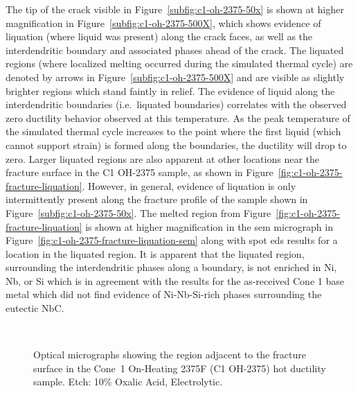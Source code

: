 The tip of the crack visible in Figure~\ref{subfig:c1-oh-2375-50x} is shown at higher magnification in Figure~\ref{subfig:c1-oh-2375-500X}, which shows evidence of liquation (where liquid was present) along the crack faces, as well as the interdendritic boundary and associated phases ahead of the crack. The liquated regions (where localized melting occurred during the simulated thermal cycle) are denoted by arrows in Figure~\ref{subfig:c1-oh-2375-500X} and are visible as slightly brighter regions which stand faintly in relief. The evidence of liquid along the interdendritic boundaries (i.e.~liquated boundaries) correlates with the observed zero ductility behavior observed at this temperature. As the peak temperature of the simulated thermal cycle increases to the point where the first liquid (which cannot support strain) is formed along the boundaries, the ductility will drop to zero. Larger liquated regions are also apparent at other locations near the fracture surface in the C1 OH-2375 sample, as shown in Figure~\ref{fig:c1-oh-2375-fracture-liquation}. However, in general, evidence of liquation is only intermittently present along the fracture profile of the sample shown in Figure~\ref{subfig:c1-oh-2375-50x}. The melted region from Figure~\ref{fig:c1-oh-2375-fracture-liquation} is shown at higher magnification in the \gls{sem} micrograph in Figure~\ref{fig:c1-oh-2375-fracture-liquation-sem} along with spot \gls{eds} results for a location in the liquated region. It is apparent that the liquated region, surrounding the interdendritic phases along a boundary, is not enriched in Ni, Nb, or Si which is in agreement with the results for the as-received Cone 1 base metal which did not find evidence of Ni-Nb-Si-rich phases surrounding the eutectic NbC.

\begin{figure}
\centering
{} \\
\caption{Optical micrographs showing the region adjacent to the fracture surface in the Cone~1 On-Heating 2375\textdegree{}F (C1 OH-2375) hot ductility sample. Etch: 10\% Oxalic Acid, Electrolytic.}
\label{fig:c1-oh-2375}
\end{figure}

